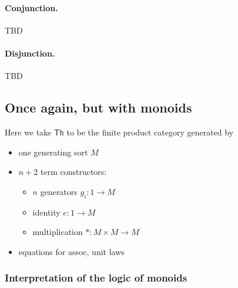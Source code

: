 \paragraph{Conjunction.}
TBD

\paragraph{Disjunction.}
TBD

\subsection{Once again, but with monoids}

Here we take $\mathsf{Th}$ to be the finite product category generated by
\begin{itemize}
  \item one generating sort $M$
  \item $n+2$ term constructors:
    \begin{itemize}
      \item $n$ generators $g_{i}: 1 \to M$
      \item identity $e: 1 \to M$
      \item multiplication $*: M \times M \to M$
    \end{itemize}
  \item equations for assoc, unit laws
\end{itemize}




\subsubsection{Interpretation of the logic of monoids}

